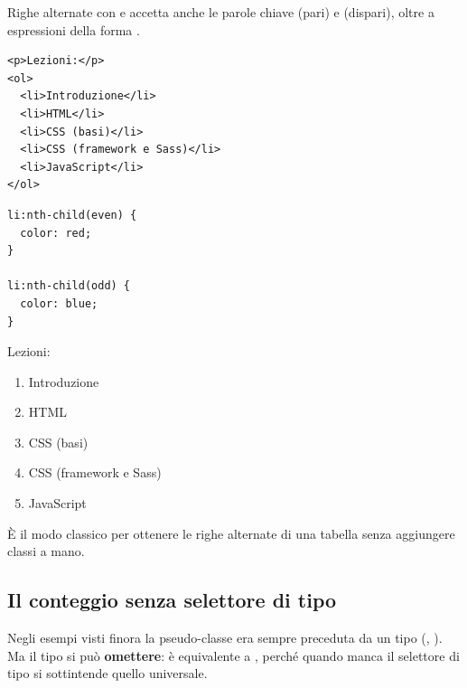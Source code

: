 \begin{esempio}{Righe alternate con  e }
 accetta anche le parole chiave  (pari) e
 (dispari), oltre a espressioni della forma .

\begin{affianco}[0.5]
\begin{lstlisting}[style=html, name=lezioni.html]
<p>Lezioni:</p>
<ol>
  <li>Introduzione</li>
  <li>HTML</li>
  <li>CSS (basi)</li>
  <li>CSS (framework e Sass)</li>
  <li>JavaScript</li>
</ol>
\end{lstlisting}

\begin{lstlisting}[style=css, name=lezioni.css]
li:nth-child(even) {
  color: red;
}

li:nth-child(odd) {
  color: blue;
}
\end{lstlisting}
\risultato
\begin{browser}
  Lezioni:
  \begin{enumerate}[leftmargin=1.9em, itemsep=0pt, topsep=2pt, parsep=0pt]
    \item \textcolor{css-blue}{Introduzione}
    \item \textcolor{css-red}{HTML}
    \item \textcolor{css-blue}{CSS (basi)}
    \item \textcolor{css-red}{CSS (framework e Sass)}
    \item \textcolor{css-blue}{JavaScript}
  \end{enumerate}
\end{browser}
\end{affianco}

È il modo classico per ottenere le righe alternate di una tabella senza
aggiungere classi a mano.
\end{esempio}

\subsection{Il conteggio senza selettore di tipo}

Negli esempi visti finora la pseudo-classe era sempre preceduta da un tipo
(, ). Ma il tipo si può
\textbf{omettere}:  è equivalente a
, perché quando manca il selettore di tipo si sottintende
quello universale.

